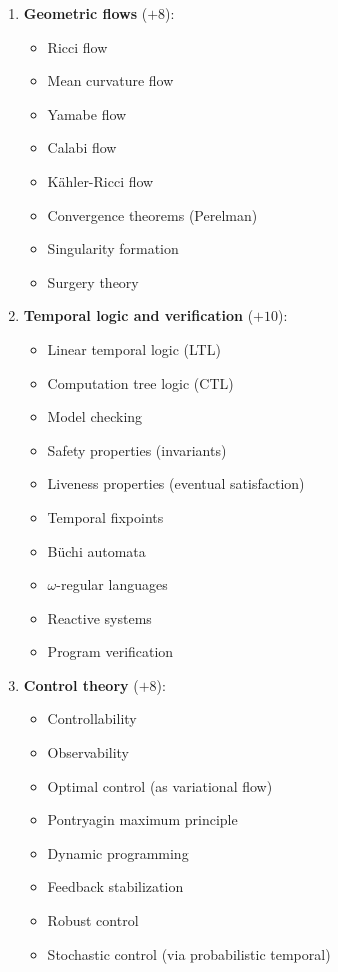 \documentclass[11pt]{article}
\theoremstyle{definition}
\begin{document}
\begin{enumerate}[leftmargin=*]
\item \textbf{Geometric flows} ($+8$):
\begin{itemize}
\item Ricci flow
\item Mean curvature flow
\item Yamabe flow
\item Calabi flow
\item Kähler-Ricci flow
\item Convergence theorems (Perelman)
\item Singularity formation
\item Surgery theory
\end{itemize}

\item \textbf{Temporal logic and verification} ($+10$):
\begin{itemize}
\item Linear temporal logic (LTL)
\item Computation tree logic (CTL)
\item Model checking
\item Safety properties (invariants)
\item Liveness properties (eventual satisfaction)
\item Temporal fixpoints
\item Büchi automata
\item $\omega$-regular languages
\item Reactive systems
\item Program verification
\end{itemize}

\item \textbf{Control theory} ($+8$):
\begin{itemize}
\item Controllability
\item Observability
\item Optimal control (as variational flow)
\item Pontryagin maximum principle
\item Dynamic programming
\item Feedback stabilization
\item Robust control
\item Stochastic control (via probabilistic temporal)
\end{itemize}


\end{enumerate}
\end{document}
